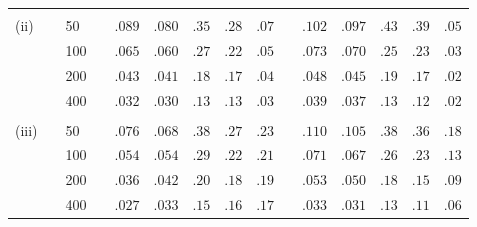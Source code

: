 \documentclass[titlepage,12pt]{article}
\begin{document}
\begin{table}[tbp]
\begin{tabular}{llllccccccccccc}
\multicolumn{1}{l}{} \\ 
(ii) &  & 50 &  & \multicolumn{1}{l}{$.089$} & \multicolumn{1}{l}{$.080$} & 
\multicolumn{1}{l}{$.35$} & \multicolumn{1}{l}{$.28$} & \multicolumn{1}{l}{$%
.07$} &  & \multicolumn{1}{l}{$.102$} & \multicolumn{1}{l}{$.097$} & 
\multicolumn{1}{l}{$.43$} & \multicolumn{1}{l}{$.39$} & \multicolumn{1}{l}{$%
.05$} \\ 
&  & 100 &  & \multicolumn{1}{l}{$.065$} & \multicolumn{1}{l}{$.060$} & 
\multicolumn{1}{l}{$.27$} & \multicolumn{1}{l}{$.22$} & \multicolumn{1}{l}{$%
.05$} &  & \multicolumn{1}{l}{$.073$} & \multicolumn{1}{l}{$.070$} & 
\multicolumn{1}{l}{$.25$} & \multicolumn{1}{l}{$.23$} & \multicolumn{1}{l}{$%
.03$} \\ 
&  & 200 &  & \multicolumn{1}{l}{$.043$} & \multicolumn{1}{l}{$.041$} & 
\multicolumn{1}{l}{$.18$} & \multicolumn{1}{l}{$.17$} & \multicolumn{1}{l}{$%
.04$} &  & \multicolumn{1}{l}{$.048$} & \multicolumn{1}{l}{$.045$} & 
\multicolumn{1}{l}{$.19$} & \multicolumn{1}{l}{$.17$} & \multicolumn{1}{l}{$%
.02$} \\ 
&  & 400 &  & \multicolumn{1}{l}{$.032$} & \multicolumn{1}{l}{$.030$} & 
\multicolumn{1}{l}{$.13$} & \multicolumn{1}{l}{$.13$} & \multicolumn{1}{l}{$%
.03$} &  & \multicolumn{1}{l}{$.039$} & \multicolumn{1}{l}{$.037$} & 
\multicolumn{1}{l}{$.13$} & \multicolumn{1}{l}{$.12$} & \multicolumn{1}{l}{$%
.02$} \\ 
&  &  &  & \multicolumn{1}{l}{} & \multicolumn{1}{l}{} & \multicolumn{1}{l}{}
& \multicolumn{1}{l}{} & \multicolumn{1}{l}{} &  & \multicolumn{1}{l}{} & 
\multicolumn{1}{l}{} & \multicolumn{1}{l}{} & \multicolumn{1}{l}{} & 
\multicolumn{1}{l}{} \\ 
(iii) &  & 50 &  & \multicolumn{1}{l}{$.076$} & \multicolumn{1}{l}{$.068$} & 
\multicolumn{1}{l}{$.38$} & \multicolumn{1}{l}{$.27$} & \multicolumn{1}{l}{$%
.23$} &  & \multicolumn{1}{l}{$.110$} & \multicolumn{1}{l}{$.105$} & 
\multicolumn{1}{l}{$.38$} & \multicolumn{1}{l}{$.36$} & \multicolumn{1}{l}{$%
.18$} \\ 
&  & 100 &  & \multicolumn{1}{l}{$.054$} & \multicolumn{1}{l}{$.054$} & 
\multicolumn{1}{l}{$.29$} & \multicolumn{1}{l}{$.22$} & \multicolumn{1}{l}{$%
.21$} &  & \multicolumn{1}{l}{$.071$} & \multicolumn{1}{l}{$.067$} & 
\multicolumn{1}{l}{$.26$} & \multicolumn{1}{l}{$.23$} & \multicolumn{1}{l}{$%
.13$} \\ 
&  & 200 &  & \multicolumn{1}{l}{$.036$} & \multicolumn{1}{l}{$.042$} & 
\multicolumn{1}{l}{$.20$} & \multicolumn{1}{l}{$.18$} & \multicolumn{1}{l}{$%
.19$} &  & \multicolumn{1}{l}{$.053$} & \multicolumn{1}{l}{$.050$} & 
\multicolumn{1}{l}{$.18$} & \multicolumn{1}{l}{$.15$} & \multicolumn{1}{l}{$%
.09$} \\ 
&  & 400 &  & \multicolumn{1}{l}{$.027$} & \multicolumn{1}{l}{$.033$} & 
\multicolumn{1}{l}{$.15$} & \multicolumn{1}{l}{$.16$} & \multicolumn{1}{l}{$%
.17$} &  & \multicolumn{1}{l}{$.033$} & \multicolumn{1}{l}{$.031$} & 
\multicolumn{1}{l}{$.13$} & \multicolumn{1}{l}{$.11$} & \multicolumn{1}{l}{$%
.06$}%
\end{tabular}


\end{table}
\end{document}
